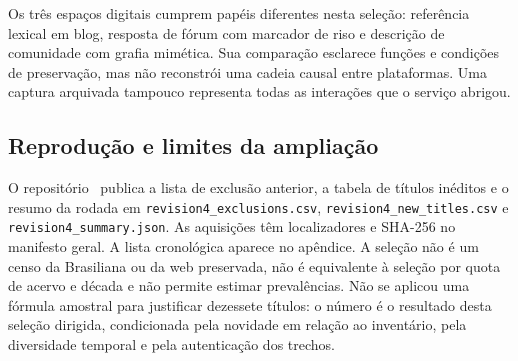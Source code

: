 Os três espaços digitais cumprem papéis diferentes nesta seleção: referência lexical em blog, resposta de fórum com marcador de riso e descrição de comunidade com grafia mimética. Sua comparação esclarece funções e condições de preservação, mas não reconstrói uma cadeia causal entre plataformas. Uma captura arquivada tampouco representa todas as interações que o serviço abrigou.

\subsection{Reprodução e limites da ampliação}

O repositório \repo\ publica a lista de exclusão anterior, a tabela de títulos inéditos e o resumo da rodada em \nolinkurl{revision4_exclusions.csv}, \nolinkurl{revision4_new_titles.csv} e \nolinkurl{revision4_summary.json}. As aquisições têm localizadores e SHA-256 no manifesto geral. A lista cronológica aparece no apêndice. A seleção não é um censo da Brasiliana ou da web preservada, não é equivalente à seleção por quota de acervo e década e não permite estimar prevalências. Não se aplicou uma fórmula amostral para justificar dezessete títulos: o número é o resultado desta seleção dirigida, condicionada pela novidade em relação ao inventário, pela diversidade temporal e pela autenticação dos trechos.
